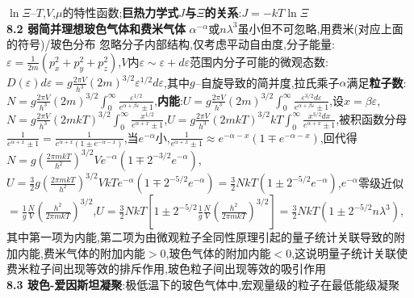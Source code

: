 \documentclass[10pt,a4paper]{article}
\begin{document}
\begin{multicols}{2}
$\ln\Xi$--$T$,$V$,$\mu$的特性函数;\textbf{巨热力学式$J$与$\Xi$的关系}:$J=-kT\ln\Xi$\\
\textbf{8.2 弱简并理想玻色气体和费米气体}
$\alpha^{-\alpha}$或$n\lambda^3$虽小但不可忽略,用费米(对应上面的符号)/玻色分布
忽略分子内部结构,仅考虑平动自由度,分子能量:$\varepsilon=\frac{1}{2m}(p_x^2+p_y^2+p_z^2)$,$V$内$\varepsilon\sim\varepsilon+d\varepsilon$范围内分子可能的微观态数:$D(\varepsilon)d\varepsilon=g\frac{2\pi V}{h^3}(2m)^{3/2}\varepsilon^{1/2}d\varepsilon$,其中$g$--自旋导致的简并度,拉氏乘子$\alpha$满足\textbf{粒子数}:$N=g\frac{2\pi V}{h^3}(2m)^{3/2}\int_0^{\infty}\frac{\varepsilon^{1/2}}{e^{\alpha+\beta\varepsilon}\pm1}$,\textbf{内能}:$U=g\frac{2\pi V}{h^3}(2m)^{3/2}\int_0^{\infty}\frac{\varepsilon^{3/2}d\varepsilon}{e^{\alpha+\beta\varepsilon}\pm1}$,设$x=\beta\varepsilon$,$N=g\frac{2\pi V}{h^3}(2mkT)^{3/2}\int_0^{\infty}\frac{x^{1/2}}{e^{\alpha+x}\pm1}$,$U=g\frac{2\pi V}{h^3}(2mkT)^{3/2}kT\int_0^{\infty}\frac{x^{3/2}dx}{e^{\alpha+x}\pm1}$,被积函数分母$\frac{1}{e^{\alpha+x}\pm1}=\frac{1}{e^{\alpha+x}(1\pm e^{-\alpha-x})}$,当$e^{-\alpha}$小,$\frac{1}{e^{\alpha+x}\pm1}\approx e^{-\alpha-x}(1\mp e^{-\alpha-x})$,回代得$N=g\left(\frac{2\pi mkT}{h^2}\right)^{3/2}Ve^{-\alpha}(1\mp 2^{-3/2}e^{-\alpha})$,$U=\frac{3}{2}g\left(\frac{2\pi mkT}{h^2}\right)^{3/2}VkTe^{-\alpha}(1\mp2^{-5/2}e^{-\alpha})=\frac{3}{2}NkT(1\pm2^{-5/2}e^{-\alpha})$,$e^{-\alpha}$零级近似$=\frac{1}{g}\frac{N}{V}\left(\frac{h^2}{2\pi mkT}\right)^{3/2}$,$U=\frac{3}{2}NkT\left[1\pm2^{-5/2}\frac{1}{g}\frac{N}{V}\left(\frac{h^2}{2\pi mkT}\right)^{3/2}\right]=\frac{3}{2}NkT\left(1\pm2^{-5/2}n\lambda^3\right)$,其中第一项为内能,第二项为由微观粒子全同性原理引起的量子统计关联导致的附加内能,费米气体的附加内能$>0$,玻色气体的附加内能$<0$,这说明量子统计关联使费米粒子间出现等效的排斥作用,玻色粒子间出现等效的吸引作用\\
\textbf{8.3 玻色-爱因斯坦凝聚}:极低温下的玻色气体中,宏观量级的粒子在最低能级凝聚\\

\end{multicols}
\end{document}
